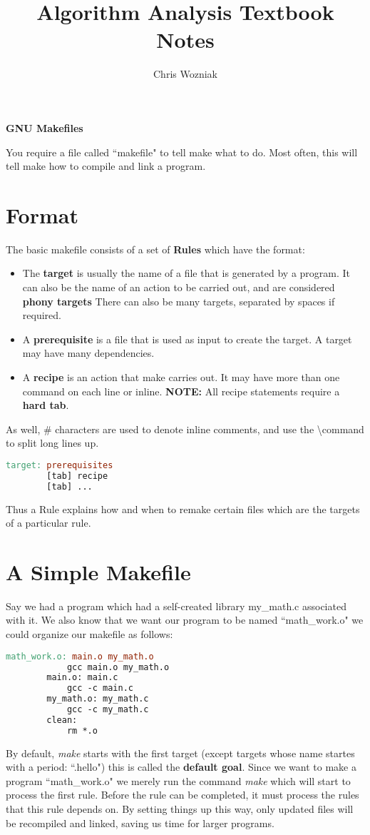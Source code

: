 \documentclass{article}
\title{Algorithm Analysis Textbook Notes}
\author{Chris Wozniak}
\begin{document}
\begin{center}
	\Large\textbf{GNU Makefiles}
\end{center}
	You require a file called ``makefile" to tell make what to do. Most often, this will tell make how to compile and link
	a program.
	\section*{Format}
		The basic makefile consists of a set of \textbf{Rules} which have the format:
		\begin{itemize}
			\item The \textbf{target} is usually the name of a file that is generated by a program. It can 
				also be the name of an action to be carried out, and are considered \textbf{phony targets} There can
				also be many targets, separated by spaces if required.
			\item A \textbf{prerequisite} is a file that is used as input to create the target. A target may have
				many dependencies.
			\item A \textbf{recipe} is an action that make carries out. It may have more than one command on each line
				or inline. \textbf{NOTE:} All recipe statements require a \textbf{hard tab}.
		\end{itemize}
		As well, \# characters are used to denote inline comments, and use the \textbackslash command to split
		long lines up.
\begin{lstlisting}[language=make]
		target: prerequisites
		[tab] recipe
		[tab] ...
\end{lstlisting}
		Thus a Rule explains how and when to remake certain files which are the targets of a particular rule.
	\section*{A Simple Makefile}
		Say we had a program which had a self-created library my\_math.c associated with it. We also know that we
		want our program to be named ``math\_work.o" we could organize our makefile as follows:
	\begin{lstlisting}[language=make]
		math_work.o: main.o my_math.o
			gcc main.o my_math.o
		main.o: main.c
			gcc -c main.c
		my_math.o: my_math.c
			gcc -c my_math.c
		clean:
			rm *.o
	\end{lstlisting}
		By default, \textit{make} starts with the first target (except targets whose name startes with a period: ``.hello") this is
		called the \textbf{default goal}. Since we want to make a program ``math\_work.o" we merely run the command 
		\textit{make} which will start to process the first rule. Before the rule can be completed, it must process the rules
		that this rule depends on. By setting things up this way, only updated files will be recompiled and linked, saving us time 
		for larger programs.
\end{document}
